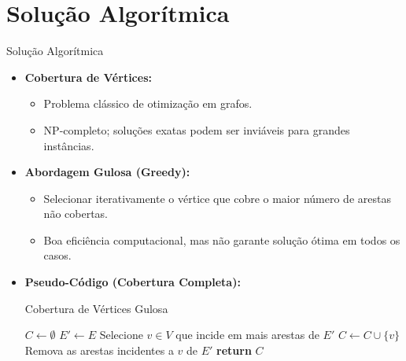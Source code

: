 \documentclass[aspectratio=169,xcolor=table]{beamer}
\begin{document}
\section{Solução Algorítmica}
\begin{frame}{Solução Algorítmica}
    \begin{itemize}
        \item \textbf{Cobertura de Vértices:}
        \begin{itemize}
            \item Problema clássico de otimização em grafos.
            \item NP-completo; soluções exatas podem ser inviáveis para grandes instâncias.
        \end{itemize}
        \item \textbf{Abordagem Gulosa (Greedy):}
        \begin{itemize}
            \item Selecionar iterativamente o vértice que cobre o maior número de arestas não cobertas.
            \item Boa eficiência computacional, mas não garante solução ótima em todos os casos.
        \end{itemize}
        \item \textbf{Pseudo-Código (Cobertura Completa):}
        \begin{algorithm}[H]
        \caption{Cobertura de Vértices Gulosa}
        \begin{algorithmic}[1]
        \State $C \gets \emptyset$
        \State $E' \gets E$ 
            \State Selecione $v \in V$ que incide em mais arestas de $E'$
            \State $C \gets C \cup \{v\}$
            \State Remova as arestas incidentes a $v$ de $E'$
        \EndWhile
        \State \textbf{return} $C$
        \end{algorithmic}
        \end{algorithm}
    \end{itemize}
\end{frame}

\end{document}
